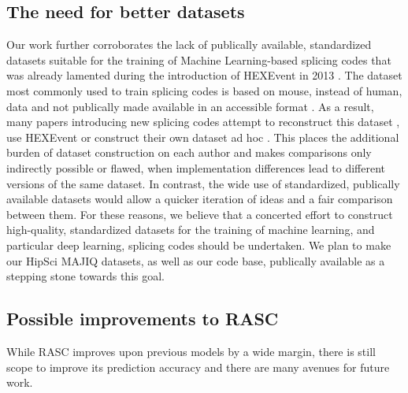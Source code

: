\subsection{The need for better datasets}
Our work further corroborates 
the lack of publically available, standardized datasets suitable for the training of Machine Learning-based splicing codes that was already lamented during the introduction of HEXEvent in 2013 \cite{hexevent}. %
The dataset most commonly used to train splicing codes is based on mouse, instead of human, data and not publically made available in an accessible format \cite{jha}. As a result, many papers introducing new splicing codes attempt to reconstruct this dataset \cite{d2vsplicing}, use HEXEvent \cite{dsc} or construct their own dataset ad hoc \cite{cossmo}. This places the additional burden of dataset construction on each author and makes comparisons only indirectly possible or flawed, when implementation differences lead to different versions of the same dataset. %
In contrast, the wide use of standardized, publically available datasets would allow a quicker iteration of ideas and a fair comparison between them. 
For these reasons, we believe that a concerted effort to construct high-quality, standardized datasets for the training of machine learning, and particular deep learning, splicing codes should be undertaken. We plan to make our HipSci MAJIQ datasets, as well as our code base, publically available as a stepping stone towards this goal.

\subsection{Possible improvements to RASC}
While RASC improves upon previous models by a wide margin, there is still scope to improve its prediction accuracy and there are many avenues for future work. 

